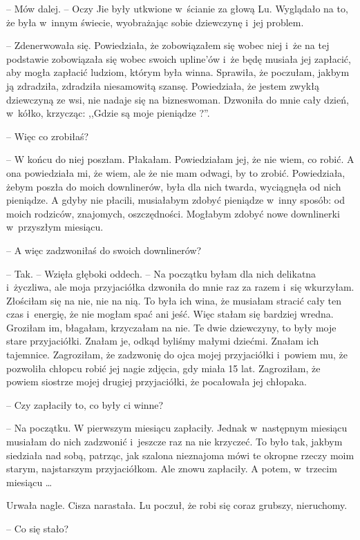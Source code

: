 \documentclass[oneside,polish,11pt,rmheadings]{mwbk}
\begin{document}
-- Mów dalej. -- Oczy Jie były utkwione w~ścianie za głową Lu. Wyglądało na to, że była w~innym świecie, wyobrażając sobie dziewczynę i~jej problem.

-- Zdenerwowała się. Powiedziała, że zobowiązałem się wobec niej i~że na tej podstawie zobowiązała się wobec swoich upline'ów i~że będę musiała jej zapłacić, aby mogła zapłacić ludziom, którym była winna. Sprawiła, że poczułam, jakbym ją zdradziła, zdradziła niesamowitą szansę. Powiedziała, że jestem zwykłą dziewczyną ze wsi, nie nadaje się na bizneswoman. Dzwoniła do mnie cały dzień, w~kółko, krzycząc: ,,Gdzie są moje pieniądze ?''.

-- Więc co zrobiłaś? 

-- W końcu do niej poszłam. Płakałam. Powiedziałam jej, że nie wiem, co robić. A ona powiedziała mi, że wiem, ale że nie mam odwagi, by to zrobić. Powiedziała, żebym poszła do moich downlinerów, była dla nich twarda, wyciągnęła od nich pieniądze. A gdyby nie płacili, musiałabym zdobyć pieniądze w~inny sposób: od moich rodziców, znajomych, oszczędności. Mogłabym zdobyć nowe downlinerki w~przyszłym miesiącu.

-- A więc zadzwoniłaś do swoich downlinerów?

-- Tak. -- Wzięła głęboki oddech. -- Na początku byłam dla nich delikatna i~życzliwa, ale moja przyjaciółka dzwoniła do mnie raz za razem i~się wkurzyłam. Złościłam się na nie, nie na nią. To była ich wina, że musiałam stracić cały ten czas i~energię, że nie mogłam spać ani jeść. Więc stałam się bardziej wredna. Groziłam im, błagałam, krzyczałam na nie. Te dwie dziewczyny, to były moje stare przyjaciółki. Znałam je, odkąd byliśmy małymi dziećmi. Znałam ich tajemnice. Zagroziłam, że zadzwonię do ojca mojej przyjaciółki i~powiem mu, że pozwoliła chłopcu robić jej nagie zdjęcia, gdy miała 15 lat. Zagroziłam, że powiem siostrze mojej drugiej przyjaciółki, że pocałowała jej chłopaka.

-- Czy zapłaciły to, co były ci winne?

-- Na początku. W pierwszym miesiącu zapłaciły. Jednak w~następnym miesiącu musiałam do nich zadzwonić i~jeszcze raz na nie krzyczeć. To było tak, jakbym siedziała nad sobą, patrząc, jak szalona nieznajoma mówi te okropne rzeczy moim starym, najstarszym przyjaciółkom. Ale znowu zapłaciły. A potem, w~trzecim miesiącu \ldots  

Urwała nagle. Cisza narastała. Lu poczuł, że robi się coraz grubszy, nieruchomy.

-- Co się stało? 
\end{document}
